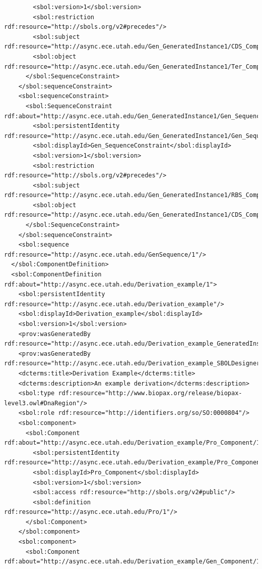 \begin{lstlisting}
        <sbol:version>1</sbol:version>
        <sbol:restriction rdf:resource="http://sbols.org/v2#precedes"/>
        <sbol:subject rdf:resource="http://async.ece.utah.edu/Gen_GeneratedInstance1/CDS_Component/1"/>
        <sbol:object rdf:resource="http://async.ece.utah.edu/Gen_GeneratedInstance1/Ter_Component/1"/>
      </sbol:SequenceConstraint>
    </sbol:sequenceConstraint>
    <sbol:sequenceConstraint>
      <sbol:SequenceConstraint rdf:about="http://async.ece.utah.edu/Gen_GeneratedInstance1/Gen_SequenceConstraint/1">
        <sbol:persistentIdentity rdf:resource="http://async.ece.utah.edu/Gen_GeneratedInstance1/Gen_SequenceConstraint"/>
        <sbol:displayId>Gen_SequenceConstraint</sbol:displayId>
        <sbol:version>1</sbol:version>
        <sbol:restriction rdf:resource="http://sbols.org/v2#precedes"/>
        <sbol:subject rdf:resource="http://async.ece.utah.edu/Gen_GeneratedInstance1/RBS_Component/1"/>
        <sbol:object rdf:resource="http://async.ece.utah.edu/Gen_GeneratedInstance1/CDS_Component/1"/>
      </sbol:SequenceConstraint>
    </sbol:sequenceConstraint>
    <sbol:sequence rdf:resource="http://async.ece.utah.edu/GenSequence/1"/>
  </sbol:ComponentDefinition>
  <sbol:ComponentDefinition rdf:about="http://async.ece.utah.edu/Derivation_example/1">
    <sbol:persistentIdentity rdf:resource="http://async.ece.utah.edu/Derivation_example"/>
    <sbol:displayId>Derivation_example</sbol:displayId>
    <sbol:version>1</sbol:version>
    <prov:wasGeneratedBy rdf:resource="http://async.ece.utah.edu/Derivation_example_GeneratedInstance21_SBOLDesignerActivity/1"/>
    <prov:wasGeneratedBy rdf:resource="http://async.ece.utah.edu/Derivation_example_SBOLDesignerActivity/1"/>
    <dcterms:title>Derivation Example</dcterms:title>
    <dcterms:description>An example derivation</dcterms:description>
    <sbol:type rdf:resource="http://www.biopax.org/release/biopax-level3.owl#DnaRegion"/>
    <sbol:role rdf:resource="http://identifiers.org/so/SO:0000804"/>
    <sbol:component>
      <sbol:Component rdf:about="http://async.ece.utah.edu/Derivation_example/Pro_Component/1">
        <sbol:persistentIdentity rdf:resource="http://async.ece.utah.edu/Derivation_example/Pro_Component"/>
        <sbol:displayId>Pro_Component</sbol:displayId>
        <sbol:version>1</sbol:version>
        <sbol:access rdf:resource="http://sbols.org/v2#public"/>
        <sbol:definition rdf:resource="http://async.ece.utah.edu/Pro/1"/>
      </sbol:Component>
    </sbol:component>
    <sbol:component>
      <sbol:Component rdf:about="http://async.ece.utah.edu/Derivation_example/Gen_Component/1">

\end{lstlisting}
